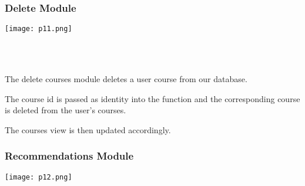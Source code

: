 \documentclass[10pt]{article}
\begin{document}
\subsubsection{Delete  Module}


\begin{center}
\texttt{[image: p11.png]}
\end{center} \\ \\

\begin{description}[font=$\bullet$~\normalfont\scshape\color{red!50!black}]
\item [] The delete courses module deletes a user course from our database.
\item [] The course id is passed as identity into the function and the corresponding course is deleted from the user’s courses.
\item [] The courses view is then updated accordingly.

\end{description}

\subsubsection{Recommendations Module}

\begin{center}
\texttt{[image: p12.png]}
\end{center} \\ \\
\end{document}
